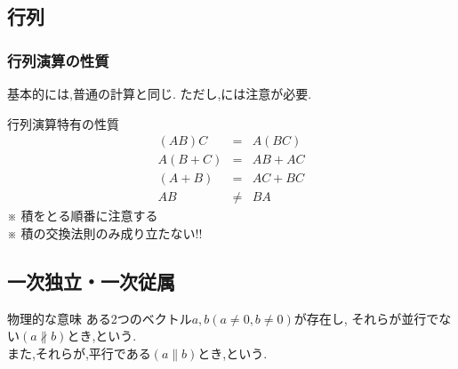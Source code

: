 \documentclass[a4paper]{jsarticle}
\begin{document}
\subsection{行列}
\subsubsection{行列演算の性質}
基本的には,普通の計算と同じ.
ただし,には注意が必要.
\begin{itembox}[l]{行列演算特有の性質}
    \begin{eqnarray*}
        \left(AB\right)C&=&A\left(BC\right)\\
        A\left(B+C\right)&=&AB+AC\\
        \left(A+B\right)&=&AC+BC\\
        AB&\neq& BA
    \end{eqnarray*}
    ※ 積をとる順番に注意する\\
    ※ 積の交換法則のみ成り立たない!!
\end{itembox}
\subsection{一次独立・一次従属}
\begin{itembox}[l]{物理的な意味}
    ある2つのベクトル$a,b\left(a\neq 0,b\neq 0\right)$が存在し,
    それらが並行でない$\left(a\not\parallel b\right)$とき,という.\\
    また,それらが,平行である$\left(a\parallel b\right)$とき,という.
\end{itembox}
\end{document}
